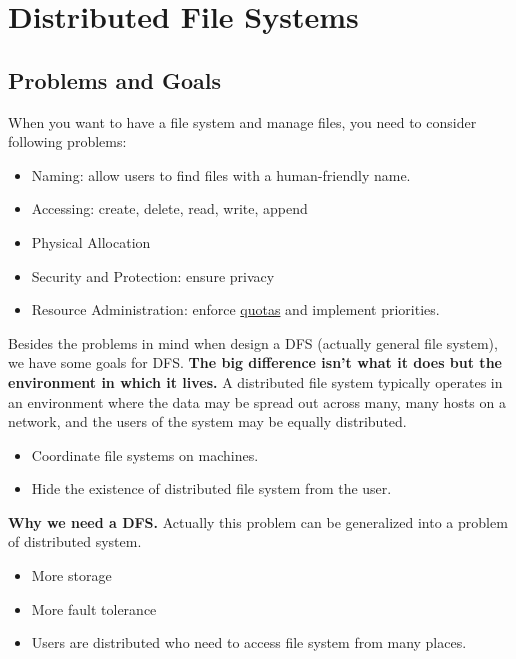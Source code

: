%
%
%

\chapter{Distributed File Systems}

\section{Problems and Goals}
When you want to have a file system and manage files, you need to consider following problems:
\begin{itemize}
    \item Naming: allow users to find files with a human-friendly name.
    \item Accessing: create, delete, read, write, append
    \item Physical Allocation
    \item Security and Protection: ensure privacy
    \item Resource Administration: enforce \underline{quotas} and implement priorities.
\end{itemize}

Besides the problems in mind when design a DFS (actually general file system), we have some goals for DFS. \textbf{The big difference isn't what it does but the environment in which it lives.} A distributed file system typically operates in an environment where the data may be spread out across many, many hosts on a network, and the users of the system may be equally distributed.
\begin{itemize}
    \item Coordinate file systems on machines.
    \item Hide the existence of distributed file system from the user.
\end{itemize}

\textbf{Why we need a DFS.} Actually this problem can be generalized into a problem of distributed system. 
\begin{itemize}
    \item More storage
    \item More fault tolerance
    \item Users are distributed who need to access file system from many places.
\end{itemize}

